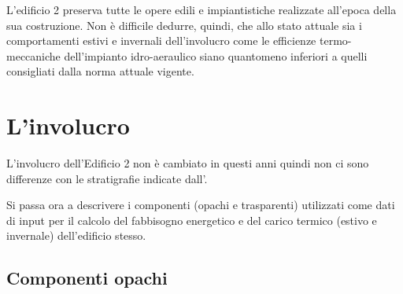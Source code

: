 L'edificio 2 preserva tutte le opere edili e impiantistiche realizzate all'epoca della sua costruzione. Non è difficile dedurre, quindi, che allo stato attuale sia i comportamenti estivi e invernali dell'involucro come le efficienze termo-meccaniche dell'impianto idro-aeraulico siano quantomeno inferiori a quelli consigliati dalla norma attuale vigente. 

\section{L'involucro}
L'involucro dell'Edificio 2 non è cambiato in questi anni quindi non ci sono differenze con le stratigrafie indicate dall'.

Si passa ora a descrivere i componenti (opachi e trasparenti) utilizzati come dati di input per il calcolo del fabbisogno energetico e del carico termico (estivo e invernale) dell'edificio stesso.
\subsection{Componenti opachi}
